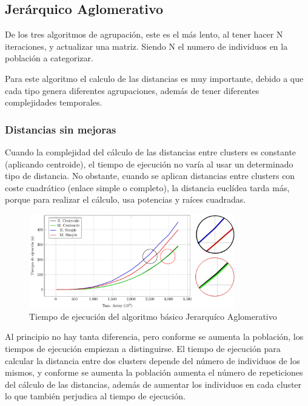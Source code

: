 	\subsection{Jerárquico Aglomerativo}
	
		De los tres algoritmos de agrupación, este es el más lento, al tener hacer N iteraciones, y actualizar una matriz. Siendo N el numero de individuos en la población a categorizar.
		
		Para este algoritmo el calculo de las distancias es muy importante, debido a que cada tipo genera diferentes agrupaciones, además de tener diferentes complejidades temporales.
		
		\subsubsection{Distancias sin mejoras}		

			Cuando la complejidad del cálculo de las distancias entre clusters es constante (aplicando centroide), el tiempo de ejecución no varía al usar un determinado tipo de distancia.
			No obstante, cuando se aplican distancias entre clusters con coste cuadrático (enlace simple o completo), la distancia euclídea tarda más, porque para realizar el cálculo, usa potencias y raíces cuadradas.
	
	
			\begin{figure}[!h]
				\centering
				\includegraphics[width=0.8\textwidth]{images/chapter_4/jerarquico}
				\caption{Tiempo de ejecución del algoritmo básico Jerarquíco Aglomerativo}
				\label{fig:prueba_jerarquicosec}
			\end{figure}
	
			\newpage 
			
			Al principio no hay tanta diferencia, pero conforme se aumenta la población, los tiempos de ejecución empiezan a distinguirse. El tiempo de ejecución para calcular la distancia entre dos clusters depende del número de individuos de los mismos, y conforme se aumenta la población aumenta el número de repeticiones del cálculo de las distancias, además de aumentar los individuos en cada cluster lo que también perjudica al tiempo de ejecución.
		
